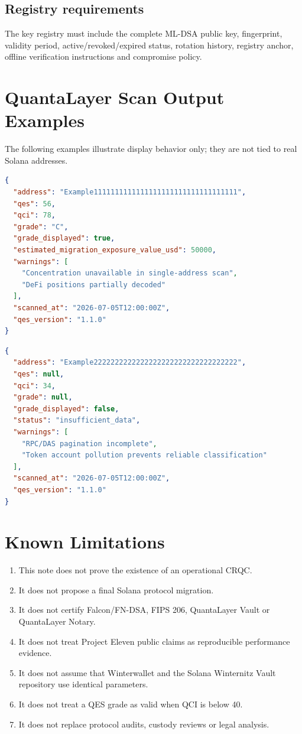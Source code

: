 \documentclass[11pt,a4paper,oneside,parskip=false]{scrartcl}
\newcommand{\QES}{\textsc{QES}}
\newcommand{\QCI}{\textsc{QCI}}
\begin{document}
\subsection{Registry requirements}

The key registry must include the complete ML-DSA public key, fingerprint, validity period, active/revoked/expired status, rotation history, registry anchor, offline verification instructions and compromise policy.

\section{QuantaLayer Scan Output Examples}
\label{appendix:scan-output}

The following examples illustrate display behavior only; they are not tied to real Solana addresses.

\begin{lstlisting}[language=json,caption={Example scan output when confidence permits grade display}]
{
  "address": "Example1111111111111111111111111111111111",
  "qes": 56,
  "qci": 78,
  "grade": "C",
  "grade_displayed": true,
  "estimated_migration_exposure_value_usd": 50000,
  "warnings": [
    "Concentration unavailable in single-address scan",
    "DeFi positions partially decoded"
  ],
  "scanned_at": "2026-07-05T12:00:00Z",
  "qes_version": "1.1.0"
}
\end{lstlisting}

\begin{lstlisting}[language=json,caption={Example scan output when confidence is insufficient}]
{
  "address": "Example2222222222222222222222222222222222",
  "qes": null,
  "qci": 34,
  "grade": null,
  "grade_displayed": false,
  "status": "insufficient_data",
  "warnings": [
    "RPC/DAS pagination incomplete",
    "Token account pollution prevents reliable classification"
  ],
  "scanned_at": "2026-07-05T12:00:00Z",
  "qes_version": "1.1.0"
}
\end{lstlisting}

\section{Known Limitations}
\label{appendix:known-limitations}

\begin{enumerate}
\item This note does not prove the existence of an operational CRQC.
\item It does not propose a final Solana protocol migration.
\item It does not certify Falcon/FN-DSA, FIPS 206, QuantaLayer Vault or QuantaLayer Notary.
\item It does not treat Project Eleven public claims as reproducible performance evidence.
\item It does not assume that Winterwallet and the Solana Winternitz Vault repository use identical parameters.
\item It does not treat a \QES{} grade as valid when \QCI{} is below 40.
\item It does not replace protocol audits, custody reviews or legal analysis.
\end{enumerate}
\end{document}
